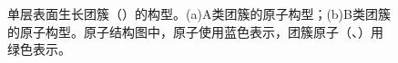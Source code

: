 \begin{figure}[!htb]
    \caption{单层表面生长团簇（）的构型。(a)A类团簇的原子构型；(b)B类团簇的原子构型。原子结构图中，原子使用蓝色表示，团簇原子（、）用绿色表示。}
    \label{fig:IS_structure_InxSb3-x}
\end{figure} 

